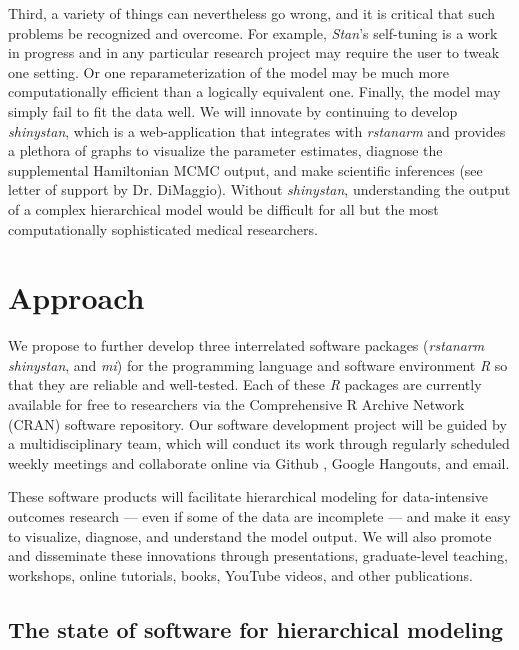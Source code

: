 \documentclass[11pt,notitlepage]{article}
\begin{document}
Third, a variety of things can nevertheless go wrong, and it is critical that such
problems be recognized and overcome. For example, \textit{Stan}'s self-tuning is a 
work in progress and in any particular research project may require the user to tweak 
one setting. Or one reparameterization of the model may be much more computationally efficient 
than a logically equivalent one. Finally, the model may simply fail to fit the data well.
We will innovate by continuing to develop \textit{shinystan}, which is a web-application
that integrates with \textit{rstanarm} and provides a plethora of graphs to visualize the 
parameter estimates, diagnose the supplemental Hamiltonian MCMC output, and make scientific
inferences (see letter of support by Dr. DiMaggio). Without \textit{shinystan}, understanding 
the output of a complex hierarchical model would be difficult for all but the most computationally 
sophisticated medical researchers.

\section*{Approach}

We propose to further develop three interrelated software packages (\textit{rstanarm} 
\textit{shinystan}, and \textit{mi}) for the programming language and software environment 
\textit{R} so that they are reliable and well-tested. Each of these \textit{R} packages are currently available for 
free to researchers via the Comprehensive R Archive Network (CRAN) software repository. Our software development project will be guided by a multidisciplinary 
team, which will conduct its work through regularly scheduled weekly meetings and collaborate online via Github 
\cite{Chacon2009ProGit}, Google Hangouts, and email.

These software products will facilitate hierarchical modeling for data-intensive outcomes research ---
even if some of the data are incomplete --- and make it easy to visualize, diagnose, and understand the model
output. We will also promote and disseminate these innovations through presentations, graduate-level teaching, 
workshops, online tutorials, books, YouTube videos, and other publications.

\subsection*{The state of software for hierarchical modeling}
\end{document}
